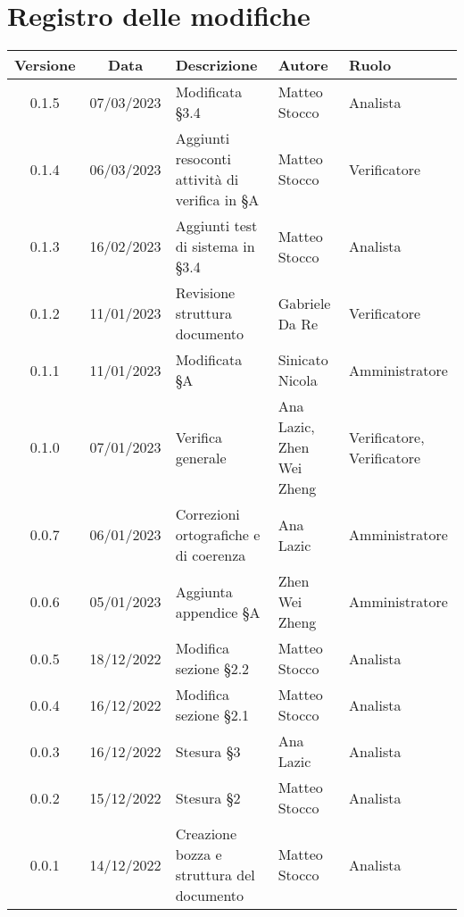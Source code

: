\section*{Registro delle modifiche}
\begin{center}
\setlength\extrarowheight{5pt}
\renewcommand\tabularxcolumn[1]{>{\Centering}m{#1}}
\begin{tabularx}{\textwidth}{| c | c | X | X | X |} 
	\hline
	\rowcolor{white}
	\textbf{Versione} & \textbf{Data} & \textbf{Descrizione} & \textbf{Autore} & \textbf{Ruolo}\\
	\hline
	0.1.5 & 07/03/2023 & Modificata §3.4 & Matteo Stocco & Analista \\
	\hline
	0.1.4 & 06/03/2023 & Aggiunti resoconti attività di verifica in §A & Matteo Stocco & Verificatore \\
    \hline
    0.1.3 & 16/02/2023 & Aggiunti test di sistema in §3.4 & Matteo Stocco & Analista \\
    \hline
	0.1.2 & 11/01/2023 & Revisione struttura documento & Gabriele Da Re & Verificatore \\
	\hline
	0.1.1 & 11/01/2023 & Modificata §A & Sinicato Nicola &Amministratore \\
    \hline
	0.1.0 & 07/01/2023 & Verifica generale & Ana Lazic, Zhen Wei Zheng & Verificatore, Verificatore \\
    \hline
	0.0.7 & 06/01/2023 & Correzioni ortografiche e di coerenza & Ana Lazic & Amministratore \\
	\hline
	0.0.6 & 05/01/2023 & Aggiunta appendice §A & Zhen Wei Zheng & Amministratore \\
	\hline
	0.0.5 & 18/12/2022 & Modifica sezione §2.2 & Matteo Stocco & Analista \\
	\hline
	0.0.4 & 16/12/2022 & Modifica sezione §2.1 & Matteo Stocco & Analista \\
     \hline
	0.0.3 & 16/12/2022 & Stesura §3 & Ana Lazic & Analista \\
	\hline
	0.0.2 & 15/12/2022 & Stesura §2 & Matteo Stocco & Analista \\
	\hline
	0.0.1 & 14/12/2022 & Creazione bozza e struttura del documento & Matteo Stocco & Analista \\
	\hline
	\end{tabularx}
\end{center}
